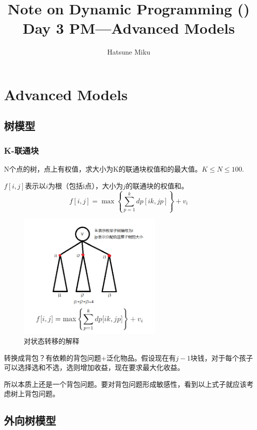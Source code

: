 \documentclass{article}
\newcommand{\romannum}[1]{\uppercase\expandafter{\romannumeral#1}}
\begin{document}
\title{Note on Dynamic Programming (\romannum{3})\\\large{Day 3 PM---Advanced Models}}\date{}\author{Hatsune Miku}
\maketitle
\section{Advanced Models}
\subsection{树模型}
\subsubsection{K-联通块}
N个点的树，点上有权值，求大小为K的联通块权值和的最大值。$K\le N\le 100.$

$f[i,j]$表示以$i$为根（包括i点），大小为$j$的联通块的权值和。
\begin{equation*}
    f[i,j]=\max\left\{\sum_{p=1}^kdp[ik,jp]\right\}+v_i
\end{equation*}
\begin{figure}[h]
    \begin{center}
        \includegraphics[width=7cm]{transtotikz.png}
    \end{center}
    \caption{对状态转移的解释}
    \label{fig. 1.1}
\end{figure}

转换成背包？有依赖的背包问题+泛化物品。假设现在有$j-1$块钱，对于每个孩子可以选择选和不选，选则增加收益，现在要求最大化收益。

所以本质上还是一个背包问题。要对背包问题形成敏感性，看到以上式子就应该考虑树上背包问题。

\iffalse
\subsection{外向树模型}
\end{document}
